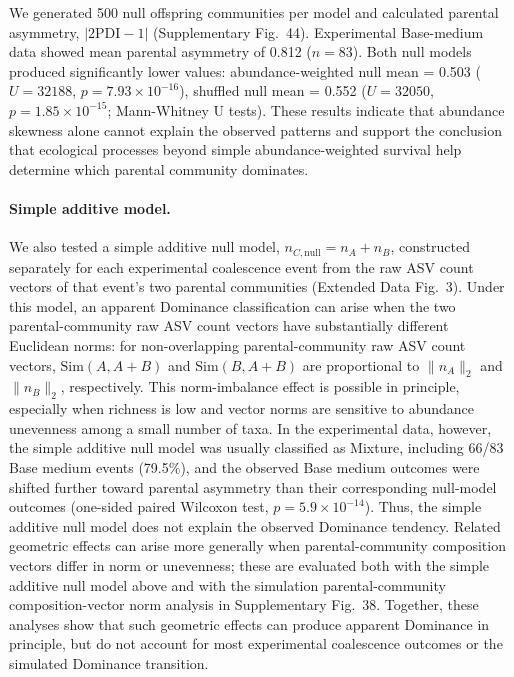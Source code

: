 We generated 500 null offspring communities per model and calculated parental asymmetry, $|2\mathrm{PDI}-1|$ (Supplementary Fig.~44). Experimental Base-medium data showed mean parental asymmetry of 0.812 ($n = 83$). Both null models produced significantly lower values: abundance-weighted null mean = 0.503 ($U = 32188$, $p = 7.93 \times 10^{-16}$), shuffled null mean = 0.552 ($U = 32050$, $p = 1.85 \times 10^{-15}$; Mann-Whitney U tests). These results indicate that abundance skewness alone cannot explain the observed patterns and support the conclusion that ecological processes beyond simple abundance-weighted survival help determine which parental community dominates.

\paragraph{Simple additive model.}
We also tested a simple additive null model, $n_{C,\mathrm{null}} = n_A+n_B$, constructed separately for each experimental coalescence event from the raw ASV count vectors of that event's two parental communities (Extended Data Fig.~3). Under this model, an apparent Dominance classification can arise when the two parental-community raw ASV count vectors have substantially different Euclidean norms: for non-overlapping parental-community raw ASV count vectors, $\mathrm{Sim}(A,A+B)$ and $\mathrm{Sim}(B,A+B)$ are proportional to $\|n_A\|_2$ and $\|n_B\|_2$, respectively. This norm-imbalance effect is possible in principle, especially when richness is low and vector norms are sensitive to abundance unevenness among a small number of taxa. In the experimental data, however, the simple additive null model was usually classified as Mixture, including 66/83 Base medium events (79.5\%), and the observed Base medium outcomes were shifted further toward parental asymmetry than their corresponding null-model outcomes (one-sided paired Wilcoxon test, $p = 5.9 \times 10^{-14}$). Thus, the simple additive null model does not explain the observed Dominance tendency. Related geometric effects can arise more generally when parental-community composition vectors differ in norm or unevenness; these are evaluated both with the simple additive null model above and with the simulation parental-community composition-vector norm analysis in Supplementary Fig.~38. Together, these analyses show that such geometric effects can produce apparent Dominance in principle, but do not account for most experimental coalescence outcomes or the simulated Dominance transition.

